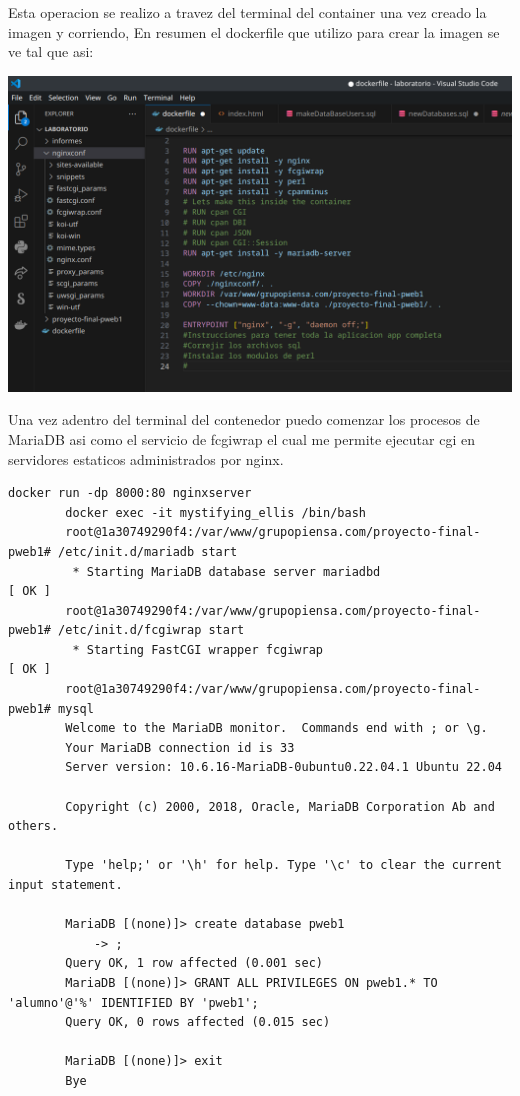 	Esta operacion se realizo a travez del terminal del container una vez creado la imagen y corriendo,
	En resumen el dockerfile que utilizo para crear la imagen se ve tal que asi:

	\includegraphics[scale=0.4]{./img/lab1_1.png}
	
	Una vez adentro del terminal del contenedor puedo comenzar los procesos de MariaDB asi como el servicio de fcgiwrap
	el cual me permite ejecutar cgi en servidores estaticos administrados por nginx.\newline \newline

	\begin{lstlisting}[style=mybash]
		docker run -dp 8000:80 nginxserver
		docker exec -it mystifying_ellis /bin/bash
		root@1a30749290f4:/var/www/grupopiensa.com/proyecto-final-pweb1# /etc/init.d/mariadb start
		 * Starting MariaDB database server mariadbd                                                                                                                                         [ OK ] 
		root@1a30749290f4:/var/www/grupopiensa.com/proyecto-final-pweb1# /etc/init.d/fcgiwrap start
		 * Starting FastCGI wrapper fcgiwrap                                                                                                                                                 [ OK ] 
		root@1a30749290f4:/var/www/grupopiensa.com/proyecto-final-pweb1# mysql
		Welcome to the MariaDB monitor.  Commands end with ; or \g.
		Your MariaDB connection id is 33
		Server version: 10.6.16-MariaDB-0ubuntu0.22.04.1 Ubuntu 22.04

		Copyright (c) 2000, 2018, Oracle, MariaDB Corporation Ab and others.

		Type 'help;' or '\h' for help. Type '\c' to clear the current input statement.

		MariaDB [(none)]> create database pweb1
		    -> ;
		Query OK, 1 row affected (0.001 sec)		
		MariaDB [(none)]> GRANT ALL PRIVILEGES ON pweb1.* TO 'alumno'@'%' IDENTIFIED BY 'pweb1';
		Query OK, 0 rows affected (0.015 sec)

		MariaDB [(none)]> exit
		Bye

	\end{lstlisting}

